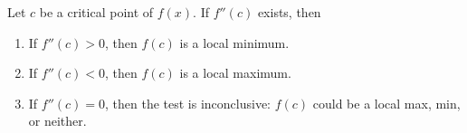 \documentclass{ximera}
\begin{document}
\begin{theorem}
Let $c$ be a critical point of $f(x)$. If $f''(c)$ exists, then
\begin{enumerate}
\item{If $f''(c)>0$, then $f(c)$ is a local minimum.}
\item{If $f''(c)<0$, then $f(c)$ is a local maximum.}
\item{If $f''(c)=0$, then the test is inconclusive: $f(c)$ could be a local max, min, or neither.}
\end{enumerate}
\end{theorem}
\end{document}
